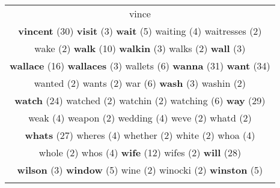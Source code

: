 \documentclass[12pt,a4paper]{article}
\begin{document}
\begin{center}
\begin{longtable}{|c|}
{vince}} \footnotesize{(4)}  \\ {\Huge \textcolor{AzulEscuro} {\bf vincent}} \footnotesize{(30)} {\small \textcolor{Laranja} {\bf visit}} \footnotesize{(3)} {\large \textcolor{Roxo} {\bf wait}} \footnotesize{(5)} {\normalsize \textcolor{VerdeLocao} {waiting}} \footnotesize{(4)} {\footnotesize \textcolor{Verde} {waitresses}} \footnotesize{(2)}  \\ {\footnotesize \textcolor{Verde} {wake}} \footnotesize{(2)} {\Huge \textcolor{AzulEscuro} {\bf walk}} \footnotesize{(10)} {\small \textcolor{Laranja} {\bf walkin}} \footnotesize{(3)} {\footnotesize \textcolor{Verde} {walks}} \footnotesize{(2)} {\small \textcolor{Laranja} {\bf wall}} \footnotesize{(3)}  \\ {\Huge \textcolor{AzulEscuro} {\bf wallace}} \footnotesize{(16)} {\small \textcolor{Laranja} {\bf wallaces}} \footnotesize{(3)} {\Large \textcolor{VermEscuro} {wallets}} \footnotesize{(6)} {\Huge \textcolor{AzulEscuro} {\bf wanna}} \footnotesize{(31)} {\Huge \textcolor{AzulEscuro} {\bf want}} \footnotesize{(34)}  \\ {\footnotesize \textcolor{Verde} {wanted}} \footnotesize{(2)} {\footnotesize \textcolor{Verde} {wants}} \footnotesize{(2)} {\Large \textcolor{VermEscuro} {war}} \footnotesize{(6)} {\small \textcolor{Laranja} {\bf wash}} \footnotesize{(3)} {\footnotesize \textcolor{Verde} {washin}} \footnotesize{(2)}  \\ {\Huge \textcolor{AzulEscuro} {\bf watch}} \footnotesize{(24)} {\footnotesize \textcolor{Verde} {watched}} \footnotesize{(2)} {\footnotesize \textcolor{Verde} {watchin}} \footnotesize{(2)} {\Large \textcolor{VermEscuro} {watching}} \footnotesize{(6)} {\Huge \textcolor{AzulEscuro} {\bf way}} \footnotesize{(29)}  \\ {\normalsize \textcolor{VerdeLocao} {weak}} \footnotesize{(4)} {\footnotesize \textcolor{Verde} {weapon}} \footnotesize{(2)} {\normalsize \textcolor{VerdeLocao} {wedding}} \footnotesize{(4)} {\footnotesize \textcolor{Verde} {weve}} \footnotesize{(2)} {\footnotesize \textcolor{Verde} {whatd}} \footnotesize{(2)}  \\ {\Huge \textcolor{AzulEscuro} {\bf whats}} \footnotesize{(27)} {\normalsize \textcolor{VerdeLocao} {wheres}} \footnotesize{(4)} {\footnotesize \textcolor{Verde} {whether}} \footnotesize{(2)} {\footnotesize \textcolor{Verde} {white}} \footnotesize{(2)} {\normalsize \textcolor{VerdeLocao} {whoa}} \footnotesize{(4)}  \\ {\footnotesize \textcolor{Verde} {whole}} \footnotesize{(2)} {\normalsize \textcolor{VerdeLocao} {whos}} \footnotesize{(4)} {\Huge \textcolor{AzulEscuro} {\bf wife}} \footnotesize{(12)} {\footnotesize \textcolor{Verde} {wifes}} \footnotesize{(2)} {\Huge \textcolor{AzulEscuro} {\bf will}} \footnotesize{(28)}  \\ {\small \textcolor{Laranja} {\bf wilson}} \footnotesize{(3)} {\large \textcolor{Roxo} {\bf window}} \footnotesize{(5)} {\footnotesize \textcolor{Verde} {wine}} \footnotesize{(2)} {\footnotesize \textcolor{Verde} {winocki}} \footnotesize{(2)} {\large \textcolor{Roxo} {\bf winston}} \footnotesize{(5)}  \\ {\small 
\end{longtable}
\end{center}
\end{document}
